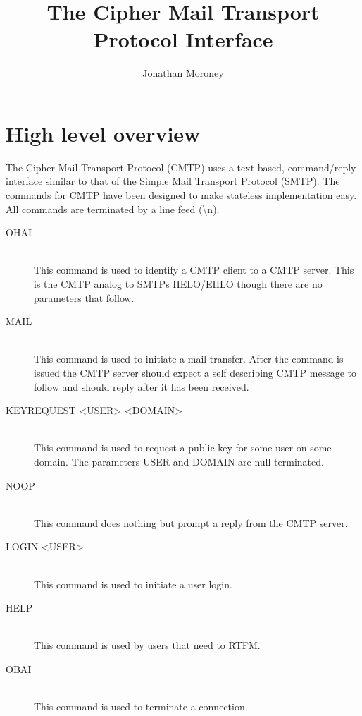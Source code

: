 \documentclass[a4paper,11pt]{article}
\title{The Cipher Mail Transport Protocol Interface}
\author{Jonathan Moroney}
\begin{document}
\maketitle
\tableofcontents


\section{High level overview}
The Cipher Mail Transport Protocol (CMTP) uses a text based, command/reply interface similar to that of the Simple Mail Transport Protocol (SMTP). The commands for CMTP have been designed to make stateless implementation easy. All commands are terminated by a line feed (\textbackslash n).
\begin{description}
  \item [OHAI] \hfill \\
  This command is used to identify a CMTP client to a CMTP server. This is the CMTP analog to SMTPs HELO/EHLO though there are no parameters that follow.
  \item [MAIL] \hfill \\
  This command is used to initiate a mail transfer. After the command is issued the CMTP server should expect a self describing CMTP message to follow and should reply after it has been received.
  \item [KEYREQUEST <USER> <DOMAIN>] \hfill \\
  This command is used to request a public key for some user on some domain. The parameters USER and DOMAIN are null terminated.
  \item [NOOP] \hfill \\
  This command does nothing but prompt a reply from the CMTP server.
  \item [LOGIN <USER>] \hfill \\
  This command is used to initiate a user login.
  \item [HELP] \hfill \\
  This command is used by users that need to RTFM.
  \item [OBAI] \hfill \\
  This command is used to terminate a connection.
\end{description}
\end{document}

